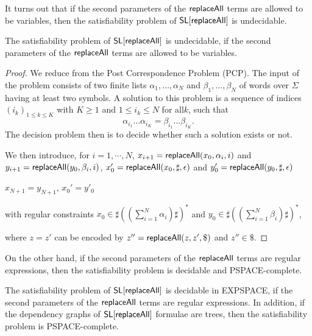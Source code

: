 It turns out that if the second parameters of the $\mathsf{replaceAll}$ terms are allowed to be variables, then the satisfiability problem of $\mathsf{SL}[\mathsf{replaceAll}]$ is undecidable.

\begin{proposition}\label{prop-und-pat-var}
The satisfiability problem of $\mathsf{SL}[\mathsf{replaceAll}]$ is undecidable, if the second parameters of the $\mathsf{replaceAll}$ terms are allowed to be variables.
\end{proposition}

\begin{proof}
	We reduce from the Post Correspondence Problem (PCP). The input of the problem consists of two finite lists $\alpha_{1},\ldots ,\alpha_{N}$ and $\beta_1,\ldots ,\beta_N$ of words over $\Sigma$ having at least two symbols. A solution to this problem is a sequence of indices $(i_{k})_{1\leq k\leq K}$ with $ K\geq 1$ and $ 1\leq i_{k}\leq N$ for all$k$, such that
	\[
	\alpha _{{i_{1}}}\ldots \alpha _{{i_{K}}}=\beta _{{i_{1}}}\ldots \beta _{{i_{K}}}.
	\]
	The decision problem then is to decide whether such a solution exists or not.
	
	We then introduce, for $i=1,\cdots, N$, 
	$x_{i+1}=\mathsf{replaceAll}(x_0, \alpha_i, i)$ and $y_{i+1}=\mathsf{replaceAll}(y_0, \beta_i, i)$, 
	$x_0'=\mathsf{replaceAll}(x_0, \sharp, \epsilon)$ and $y_0'=\mathsf{replaceAll}(y_0, \sharp, \epsilon)$
	
	$x_{N+1}=y_{N+1}$, $x_0'=y'_0$
	
	
	with regular constraints $x_0\in \sharp((\sum_{i=1}^N\alpha_i)\sharp)^*$ and $y_0\in \sharp((\sum_{i=1}^N\beta_i)\sharp)^*$,
	
	where $z=z'$ can be encoded by 
		$z''=\mathsf{replaceAll}(z, z', \$)$ and $z''\in \$$. 
\end{proof}


On the other hand, if the second parameters of the $\mathsf{replaceAll}$ terms are regular expressions, then the satisfiability problem is decidable and PSPACE-complete. 

\begin{theorem}\label{thm-main}
The satisfiability problem of $\mathsf{SL}[\mathsf{replaceAll}]$ is decidable in EXPSPACE, if the second parameters of the $\mathsf{replaceAll}$ terms are regular expressions. In addition, if the dependency graphs of $\mathsf{SL}[\mathsf{replaceAll}]$ formulae are trees, then the satisfiability problem is PSPACE-complete.
\end{theorem}

